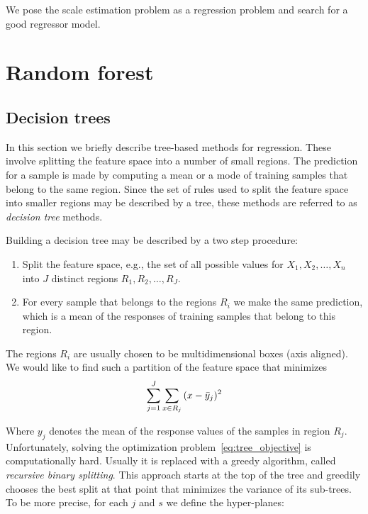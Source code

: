 We pose the scale estimation problem as a regression problem and
search for a good regressor model.

\section{Random forest}

\subsection{Decision trees}

In this section we briefly describe tree-based methods for regression.
These involve splitting the feature space into a number of small
regions.  The prediction for a sample is made by computing a mean or a
mode of training samples that belong to the same region.  Since the
set of rules used to split the feature space into smaller regions may
be described by a tree, these methods are referred to as
\textit{decision tree} methods.

Building a decision tree may be described by a two step procedure:
\begin{enumerate}
\item Split the feature space, e.g., the set of all possible values
  for $X_1, X_2,\ldots,X_n$ into $J$ distinct regions $R_1, R_2,\ldots, R_J$.
\item For every sample that belongs to the regions $R_i$ we make the
  same prediction, which is a mean of the responses of training
  samples that belong to this region.
\end{enumerate}

The regions $R_i$ are usually chosen to be multidimensional boxes (axis aligned).  We would like to find such a partition of the feature space that minimizes
\begin{equation}\label{eq:tree_objective}
\sum\limits_{j=1}^J\sum_{x\in R_j}{(x-\bar{y}_j)^2}
\end{equation}

Where $y_j$ denotes the mean of the response values of the samples in
region $R_j$.  Unfortunately, solving the optimization
problem~\ref{eq:tree_objective} is computationally hard.  Usually it
is replaced with a greedy algorithm, called \textit{recursive binary
  splitting}.  This approach starts at the top of the tree and
greedily chooses the best split at that point that minimizes the
variance of its sub-trees.  To be more precise, for each $j$ and $s$
we define the hyper-planes:

